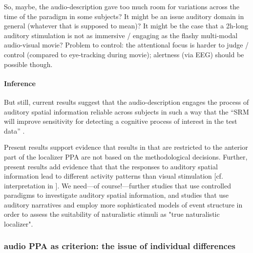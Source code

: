 
%
So, maybe, the audio-description gave too much room for variations across the
time of the paradigm in some subjects?
%
It might be an issue auditory domain in general (whatever that is supposed to
mean)?
%
It might be the case that a 2h-long auditory stimulation is not as immersive /
engaging as the flashy multi-modal audio-visual movie?
%
Problem to control: the attentional focus is harder to judge / control (compared
to eye-tracking during movie);
%
alertness (via EEG) should be possible though.



\paragraph{Inference}

%
But still, current results suggest that the audio-description engages the
process of auditory spatial information reliable across subjects in such a way
that the ``SRM will improve sensitivity for detecting a cognitive process of
interest in the test data'' \citep{cohen2017computational}.


%
Present results support evidence that results in \citet{haeusler2022processing}
that are restricted to the anterior part of the localizer PPA are not based on
the methodological decisions.
%
Further, present results add evidence that that the responses to auditory
spatial information lead to different activity patterns than visual stimulation
[cf. interpretation in \citet{haeusler2022processing}].
%
We need---of course!---further studies that use controlled paradigms to
investigate auditory spatial information, and studies that use auditory
narratives and employ more sophisticated models of event structure in order to
assess the suitability of naturalistic stimuli as "true naturalistic localizer".



\subsubsection{audio PPA as criterion: the issue of individual differences}




